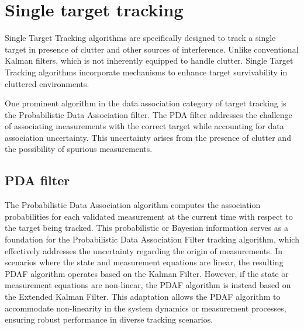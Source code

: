 \section{Single target tracking}
Single Target Tracking algorithms are specifically designed to track a single target in presence of clutter and other
sources
of interference. Unlike conventional Kalman filters, which is not inherently equipped to handle clutter. Single Target
Tracking algorithms incorporate mechanisms to enhance target survivability in cluttered environments.

One prominent algorithm in the data association category of target tracking is the Probabilistic Data Association filter. The PDA filter addresses the challenge of associating measurements with the correct target while accounting for data association uncertainty. This uncertainty arises from the presence of clutter and the possibility of spurious measurements.


\subsection{PDA filter}
\label{sec:pda_filter}
The Probabilistic Data Association algorithm computes the association probabilities for each validated measurement at
the current time with respect to the target being tracked. This probabilistic or Bayesian information serves as a
foundation for the Probabilistic Data Association Filter tracking algorithm, which effectively addresses the uncertainty regarding the origin of measurements. In scenarios where the state and measurement equations are linear, the resulting PDAF algorithm operates based on the Kalman Filter. However, if the state or measurement equations are non-linear, the PDAF algorithm is instead based on the Extended Kalman Filter. This adaptation allows the PDAF algorithm to accommodate non-linearity in the system dynamics or measurement processes, ensuring robust performance in diverse tracking scenarios.

